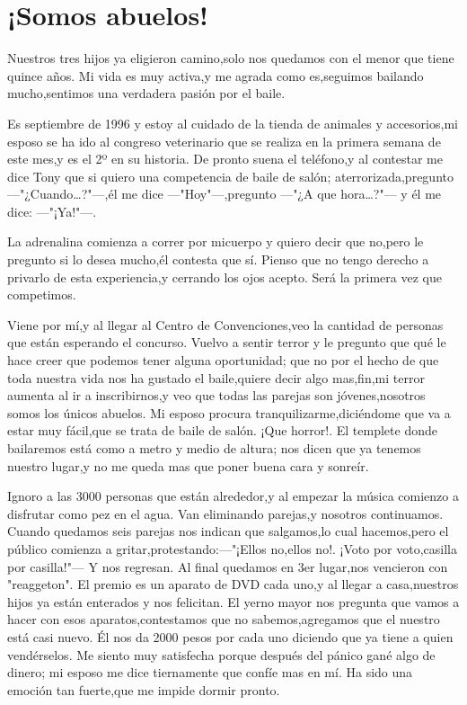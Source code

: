 \documentclass[letterpaper,12pt]{book}
\begin{document}
\chapter{¡Somos abuelos!}
Nuestros tres hijos ya eligieron camino,solo nos quedamos con el menor que tiene quince años. Mi vida es muy activa,y me agrada como es,seguimos bailando mucho,sentimos una verdadera pasión por el baile.  

Es septiembre de 1996 y estoy al cuidado de la tienda de animales y accesorios,mi esposo se ha ido al congreso veterinario que se realiza en la primera semana de este mes,y es el 2º en su historia. De pronto suena el teléfono,y al contestar me dice Tony que si quiero una competencia de baile de salón; aterrorizada,pregunto ---"¿Cuando\ldots?"---,él me dice ---"Hoy"---,pregunto ---"¿A que hora\ldots?"--- y él me dice: ---"¡Ya!"---.

La adrenalina comienza a correr por micuerpo y quiero decir que no,pero le pregunto si lo desea mucho,él contesta que sí. Pienso que no tengo derecho a privarlo de esta experiencia,y cerrando los ojos acepto. Será la primera vez que competimos.

Viene por mí,y al llegar al Centro de Convenciones,veo la cantidad de personas que están esperando el concurso. Vuelvo a sentir terror y le pregunto que qué le hace creer que podemos tener alguna oportunidad; que no por el hecho de que toda nuestra vida nos ha gustado el baile,quiere decir algo mas,fin,mi terror aumenta al ir a inscribirnos,y veo que todas las parejas son jóvenes,nosotros somos los únicos abuelos. Mi esposo procura tranquilizarme,diciéndome que va a estar muy fácil,que se trata de baile de salón. ¡Que horror!. El templete donde bailaremos está como a metro y medio de altura; nos dicen que ya tenemos nuestro lugar,y no me queda mas que poner buena cara y sonreír. 

Ignoro a las 3000 personas que están alrededor,y al empezar la música comienzo a disfrutar como pez en el agua. Van eliminando parejas,y nosotros continuamos. Cuando quedamos seis parejas nos indican que salgamos,lo cual hacemos,pero el público comienza a gritar,protestando:---"¡Ellos no,ellos no!. ¡Voto por voto,casilla por casilla!"--- Y nos regresan. Al final quedamos en 3er lugar,nos vencieron con "reaggeton". El premio es un aparato de DVD cada uno,y al llegar a casa,nuestros hijos ya están enterados y nos felicitan. El yerno mayor nos pregunta que vamos a hacer con esos aparatos,contestamos que no sabemos,agregamos que el nuestro está casi nuevo. Él nos da 2000 pesos por cada uno diciendo que ya tiene a quien vendérselos. Me siento muy satisfecha porque después del pánico gané algo de dinero; mi esposo me dice tiernamente que confíe mas en mí. Ha sido una emoción tan fuerte,que me impide dormir pronto.
\end{document}
